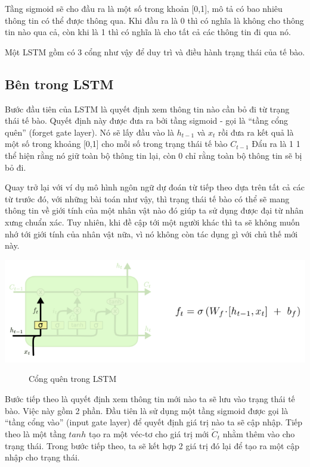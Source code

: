 Tầng sigmoid sẽ cho đầu ra là một số trong khoản [0,1], mô tả có bao nhiêu thông tin có thể được thông qua. Khi đầu ra là 0 thì có nghĩa là không cho thông tin nào qua cả, còn khi là 1 thì có nghĩa là cho tất cả các thông tin đi qua nó.\par
Một LSTM gồm có 3 cổng như vậy để duy trì và điều hành trạng thái của tế bào.
\subsection{Bên trong LSTM}
Bước đầu tiên của LSTM là quyết định xem thông tin nào cần bỏ đi từ trạng thái tế bào. Quyết định này được đưa ra bởi tầng sigmoid - gọi là “tầng cổng quên” (forget gate layer). Nó sẽ lấy đầu vào là $h_{t-1}$ và $x_{t}$ rồi đưa ra kết quả là một số trong khoảng [0,1] cho mỗi số trong trạng thái tế bào $C_{t-1}$ Đẩu ra là 1 1 thể hiện rằng nó giữ toàn bộ thông tin lại, còn 0 chỉ rằng toàn bộ thông tin sẽ bị bỏ đi.\par
Quay trở lại với ví dụ mô hình ngôn ngữ dự đoán từ tiếp theo dựa trên tất cả các từ trước đó, với những bài toán như vậy, thì trạng thái tế bào có thể sẽ mang thông tin về giới tính của một nhân vật nào đó giúp ta sử dụng được đại từ nhân xưng chuẩn xác. Tuy nhiên, khi đề cập tới một người khác thì ta sẽ không muốn nhớ tới giới tính của nhân vật nữa, vì nó không còn tác dụng gì với chủ thế mới này.
\begin{center}
    \includegraphics[scale=.5]{image/chapter6/bt1.png}
    \begin{figure}[htp]
    \begin{center}
     
    \end{center}
    \caption{Cổng quên trong LSTM}
    \end{figure}
\end{center}
Bước tiếp theo là quyết định xem thông tin mới nào ta sẽ lưu vào trạng thái tế bào. Việc này gồm 2 phần. Đầu tiên là sử dụng một tầng sigmoid được gọi là “tầng cổng vào” (input gate layer) để quyết định giá trị nào ta sẽ cập nhập. Tiếp theo là một tầng $tanh$ tạo ra một véc-tơ cho giá trị mới $\widetilde{C}_{t}$ nhằm thêm vào cho trạng thái. Trong bước tiếp theo, ta sẽ kết hợp 2 giá trị đó lại để tạo ra một cập nhập cho trạng thái.\par
